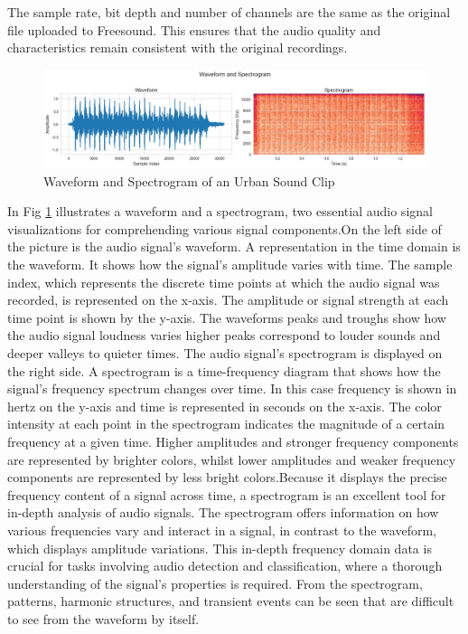 \documentclass[conference]{IEEEtran}
\begin{document}
The sample rate, bit depth and number of channels are the same as the original file uploaded to Freesound. This ensures that the audio quality and characteristics remain consistent with the original recordings.



\begin{figure}[htbp]
\centering
\includegraphics[width=\textwidth]{Images/signal.png}
\caption{Waveform and Spectrogram of an Urban Sound Clip}
\label{fig:waveform}
\end{figure}

In Fig \ref{fig:waveform} illustrates a waveform and a spectrogram, two essential audio signal visualizations for comprehending various signal components.On the left side of the picture is the audio signal's waveform. A representation in the time domain is the waveform. It shows how the signal's amplitude varies with time. The sample index, which represents the discrete time points at which the audio signal was recorded, is represented on the x-axis. The amplitude or signal strength at each time point is shown by the y-axis. The waveforms peaks and troughs show how the audio signal loudness varies higher peaks correspond to louder sounds and deeper valleys to quieter times. The audio signal's spectrogram is displayed on the right side. A spectrogram is a time-frequency diagram that shows how the signal's frequency spectrum changes over time. In this case frequency is shown in hertz on the y-axis and time is represented in seconds on the x-axis. The color intensity at each point in the spectrogram indicates the magnitude of a certain frequency at a given time. Higher amplitudes and stronger frequency components are represented by brighter colors, whilst lower amplitudes and weaker frequency components are represented by less bright colors.Because it displays the precise frequency content of a signal across time, a spectrogram is an excellent tool for in-depth analysis of audio signals. The spectrogram offers information on how various frequencies vary and interact in a signal, in contrast to the waveform, which displays amplitude variations. This in-depth frequency domain data is crucial for tasks involving audio detection and classification, where a thorough understanding of the signal's properties is required. From the spectrogram, patterns, harmonic structures, and transient events can be seen that are difficult to see from the waveform by itself.
\end{document}
